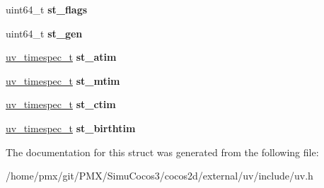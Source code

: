 \begin{DoxyCompactItemize}
uint64\+\_\+t {\bfseries st\+\_\+flags}
\item 
\mbox{\label{structuv__stat__t_ab5036343ef8adaabecc2362f5905b9cb}} 
uint64\+\_\+t {\bfseries st\+\_\+gen}
\item 
\mbox{\label{structuv__stat__t_a90374cf48291ecde29394d1982b9eec8}} 
\hyperlink{structuv__timespec__t}{uv\+\_\+timespec\+\_\+t} {\bfseries st\+\_\+atim}
\item 
\mbox{\label{structuv__stat__t_a89f339b980cacb16da47d7a7c04f7e8a}} 
\hyperlink{structuv__timespec__t}{uv\+\_\+timespec\+\_\+t} {\bfseries st\+\_\+mtim}
\item 
\mbox{\label{structuv__stat__t_a7785fcfd6909d22b07f8461219ca2133}} 
\hyperlink{structuv__timespec__t}{uv\+\_\+timespec\+\_\+t} {\bfseries st\+\_\+ctim}
\item 
\mbox{\label{structuv__stat__t_a324b6bb9a3dcb70259e0195379c5f9ef}} 
\hyperlink{structuv__timespec__t}{uv\+\_\+timespec\+\_\+t} {\bfseries st\+\_\+birthtim}
\end{DoxyCompactItemize}


The documentation for this struct was generated from the following file\+:\begin{DoxyCompactItemize}
\item 
/home/pmx/git/\+P\+M\+X/\+Simu\+Cocos3/cocos2d/external/uv/include/uv.\+h\end{DoxyCompactItemize}

